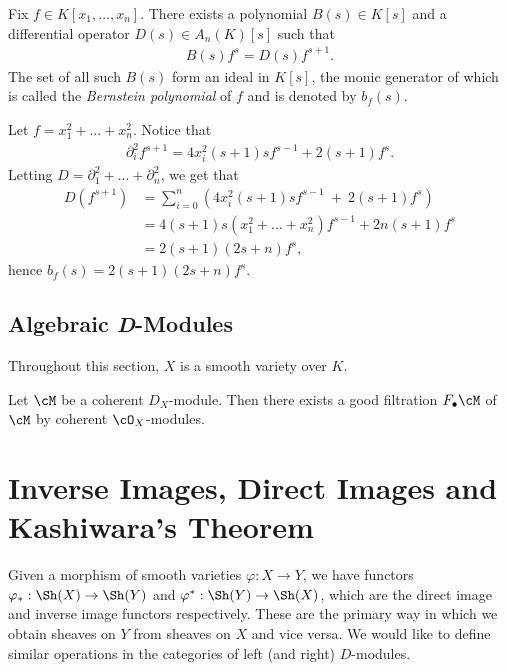 \begin{thm}\label{thm:b-functions-Weyl}
	Fix $f \in K[x_1,...,x_n]$. There exists a polynomial $B(s) \in K[s]$ and a differential operator $D(s)\in A_n(K)[s]$ such that
	\begin{align*}
		B(s)f^s = D(s) f^{s+1}.
	\end{align*}
	The set of all such $B(s)$ form an ideal in $K[s]$, the monic generator of which is called the \emph{Bernstein polynomial} of $f$ and is denoted by $b_f(s)$.
\end{thm}
\begin{example}\label{example:explicit-b-function1}
	Let $f = x_1^2+...+x_n^2$. Notice that
	\begin{align*}
		\partial_i^2 f^{s+1} = 4x_i^2(s+1)sf^{s-1} + 2(s+1)f^s.
	\end{align*}
	Letting $D = \partial_1^2 + ... + \partial_n^2$, we get that
	\begin{align*}
		D(f^{s+1})
		  &= \sum_{i=0}^n \left(4x_i^2(s+1)sf^{s-1} ~+~ 2(s+1)f^s\right) \\
		  &= 4(s+1)s(x_1^2+...+x_n^2)f^{s-1} + 2n(s+1)f^s \\
		  &= 2(s+1)(2s+ n)f^s,
	\end{align*}
	hence $b_f(s) = 2(s+1)(2s+n)f^s$.
\end{example}


\subsection{Algebraic \textit{D}-Modules}

Throughout this section, $X$ is a smooth variety over $K$.

\begin{lem}\label{lem:global-good-filtrations-exist}
	Let $\cM$ be a coherent $D_X$-module. Then there exists a good filtration $F_\bullet \cM$ of $\cM$ by coherent $\cO_X$-modules.
\end{lem}

\section{Inverse Images, Direct Images and Kashiwara's Theorem}
Given a morphism of smooth varieties $\varphi:X\to Y$, we have functors $\varphi_*:\Sh(X)\to \Sh(Y)$ and $\varphi^*:\Sh(Y) \to \Sh(X)$, which are the direct image and inverse image functors respectively. These are the primary way in which we obtain sheaves on $Y$ from sheaves on $X$ and vice versa. We would like to define similar operations in the categories of left (and right) $D$-modules. 

